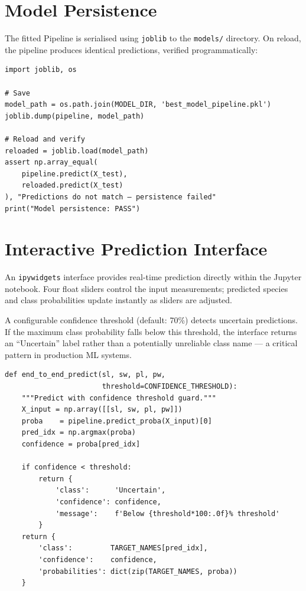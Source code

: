 \documentclass[12pt, a4paper]{report}
\newcommand{\code}[1]{\texttt{\small\textcolor{primary}{#1}}}
\begin{document}
\section{Model Persistence}

The fitted Pipeline is serialised using \code{joblib} to the \code{models/} directory.
On reload, the pipeline produces identical predictions, verified programmatically:

\begin{lstlisting}[caption={Model persistence and reload verification},label={lst:persist}]
import joblib, os

# Save
model_path = os.path.join(MODEL_DIR, 'best_model_pipeline.pkl')
joblib.dump(pipeline, model_path)

# Reload and verify
reloaded = joblib.load(model_path)
assert np.array_equal(
    pipeline.predict(X_test),
    reloaded.predict(X_test)
), "Predictions do not match — persistence failed"
print("Model persistence: PASS")
\end{lstlisting}

\section{Interactive Prediction Interface}

An \code{ipywidgets} interface provides real-time prediction directly within the Jupyter
notebook. Four float sliders control the input measurements; predicted species and class
probabilities update instantly as sliders are adjusted.

A configurable confidence threshold (default: 70\%) detects uncertain predictions. If the
maximum class probability falls below this threshold, the interface returns an
``Uncertain'' label rather than a potentially unreliable class name — a critical pattern
in production ML systems.

\begin{lstlisting}[caption={Confidence-threshold prediction function},label={lst:predict}]
def end_to_end_predict(sl, sw, pl, pw,
                       threshold=CONFIDENCE_THRESHOLD):
    """Predict with confidence threshold guard."""
    X_input = np.array([[sl, sw, pl, pw]])
    proba    = pipeline.predict_proba(X_input)[0]
    pred_idx = np.argmax(proba)
    confidence = proba[pred_idx]

    if confidence < threshold:
        return {
            'class':      'Uncertain',
            'confidence': confidence,
            'message':    f'Below {threshold*100:.0f}% threshold'
        }
    return {
        'class':         TARGET_NAMES[pred_idx],
        'confidence':    confidence,
        'probabilities': dict(zip(TARGET_NAMES, proba))
    }
\end{lstlisting}
\end{document}
